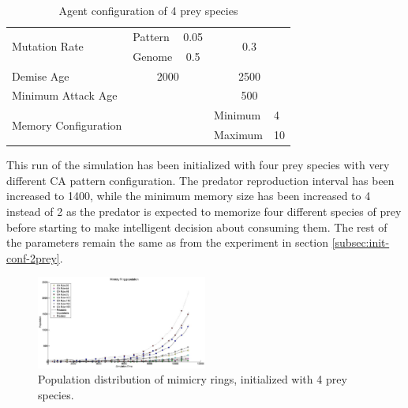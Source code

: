 \documentclass[letterpaper]{article}
\numberwithin{equation}{section}
\begin{document}
\begin{table}[h]
\begin{tabular}{| p{2cm} | p{1.5cm} | p{1cm} | p{.5cm} | p{1.5cm} | p{.5cm} |}
  \multirow{2}{*}{Mutation Rate} & Pattern   & \multicolumn{2}{c|}{0.05} & \multicolumn{2}{c|}{\multirow{2}{*}{0.3}} \\ \cline{2-4}
  						 									 & Genome    & \multicolumn{2}{c|}{0.5}  & \multicolumn{2}{c|}{} \\ \hline
  Demise Age	 									 & \multicolumn{3}{c|}{2000}							& \multicolumn{2}{c|}{2500} \\ \hline
  Minimum Attack Age						 & \multicolumn{3}{c|}{} 						    & \multicolumn{2}{c|}{500} \\ \hline
  \multirow{2}{*}{\parbox{2cm}{Memory Configuration}} & \multicolumn{3}{c|}{} 					& Minimum & 4 \\ \cline{5-6}
   																			& \multicolumn{3}{c|}{} 					& Maximum & 10 \\ \hline  
\end{tabular}
\caption{Agent configuration of 4 prey species}
\label{tab:config-table-4-prey}
\end{table}

This run of the simulation has been initialized with four prey species with very different CA pattern configuration. The predator reproduction interval has been increased to 1400, while the minimum memory size has been increased to 4 instead of 2 as the predator is expected to memorize four different species of prey before starting to make intelligent decision about consuming them. The rest of the parameters remain the same as from the experiment in section \ref{subsec:init-conf-2prey}.

\begin{figure}[H]
	\centering
	\includegraphics[width=0.5\textwidth]{../tex/images/simTime10k-4Prey}
	\caption[Population distribution of mimicry rings (4 prey species)]{Population distribution of mimicry rings, initialized with 4 prey species.}
	\label{fig:plot-4-prey}
\end{figure}
\end{document}

